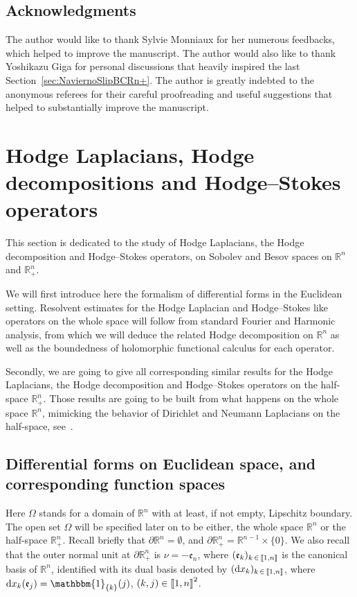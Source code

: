 \documentclass[AHL,Unicode,longabstracts,published]{cedram}
\newcommand{\bbR}{\mathbb{R}}
\newcommand{\rmd}{\mathrm{d}}
\newcommand{\fke}{\mathfrak{e}}
\newcommand{\llbracket}{\mathopen{[\mkern -2.7mu[}}
\newcommand{\rrbracket}{\mathclose{]\mkern -2.7mu]}}
\newcommand{\llb}{\llbracket}
\newcommand{\rrb}{\rrbracket}
\begin{document}
\subsection*{Acknowledgments}

The author would like to thank Sylvie Monniaux for her numerous feedbacks, which helped to improve the manuscript. The author would also like to thank Yoshikazu Giga for personal discussions that heavily inspired the last Section~\ref{sec:NaviernoSlipBCRn+}. The author is greatly indebted to the anonymous referees for their careful proofreading and useful suggestions that helped to substantially improve the manuscript.

\section{Hodge Laplacians, Hodge decompositions and Hodge--Stokes operators}

This section is dedicated to the study of Hodge Laplacians, the Hodge decomposition and Hodge--Stokes operators, on Sobolev and Besov spaces on $\bbR^n$ and $\bbR^n_+$.

We will first introduce here the formalism of differential forms in the Euclidean setting. Resolvent estimates for the Hodge Laplacian and Hodge--Stokes like operators on the whole space will follow from standard Fourier and Harmonic analysis, from which we will deduce the related Hodge decomposition on $\bbR^n$ as well as the boundedness of holomorphic functional calculus for each operator.

Secondly, we are going to give all corresponding similar results for the Hodge Laplacians, the Hodge decomposition and Hodge--Stokes operators on the half-space $\bbR^n_+$. Those results are going to be built from what happens on the whole space $\bbR^n$, mimicking the behavior of Dirichlet and Neumann Laplacians on the half-space, see~\cite[Section~5]{Gaudin2022}.



\subsection{Differential forms on Euclidean space, and corresponding function spaces}

Here $\Omega$ stands for a domain of $\bbR^n$ with at least, if not empty, Lipschitz boundary. The open set $\Omega$ will be specified later on to be either, the whole space $\bbR^n$ or the half-space $\bbR^n_+$. Recall briefly that $\partial\bbR^n = \emptyset$, and $\partial\bbR^n_+ = \bbR^{n-1}\times \{0\}$. We also recall that the outer normal unit at $\partial\bbR^n_+$ is ${\nu} = -\fke_n$, where $(\fke_k)_{k\,\in\,\llb 1, n\rrb}$ is the canonical basis of $\bbR^n$, identified with its dual basis denoted by $(\rmd x_{k})_{k\,\in\,\llb 1,n\rrb}$, where $\rmd x_{k}(\fke _j) = \mathbbm{1}_{\{k\}}(j)$, $(k,j)\in\llb 1,n\rrb^2$.
\end{document}
